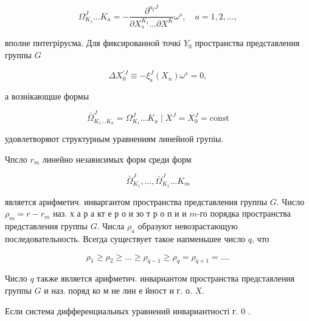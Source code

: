 \documentclass[10pt]{article}
\begin{document}
\[

\Omega_{K_{1}}^{J} \ldots K_{a}=-\frac{\partial^{a_{\xi} J}}{\partial X_{s}^{K_{1}} \ldots \partial X^{K}} \omega^{s}, \quad a=1,2, \ldots,

\]



вполне пнтегрірусма. Для фиксированной точкі $Y_{0}$ пространства представления группы $G$



\[

\Delta X_{0}^{\prime J} \equiv-\xi_{\mathrm{s}}^{J}\left(X_{n}\right) \omega^{s}=0,

\]



а вознікающше формы



\[

\bar{\Omega}_{K_{1} \ldots K_{a}}^{J}=\Omega_{K_{1}}^{J} \ldots K_{a} \mid X^{J}=X_{0}^{J}=\mathrm{const}

\]



удовлетворяют структурным уравнениям линейной групіы.



Чпсло $r_{m}$ линейно независимых форм среди форм



\[

\bar{\Omega}_{K_{1}}^{J}, \ldots, \bar{\Omega}_{K_{1}}^{J} \ldots K_{m}

\]



является арифметич. инваргантом пространства представления группы $G$. Число $\rho_{m}=r-r_{m}$ наз. х а р а кт е р о и зо т р о п и и $m$-го порядка пространства представления группы $G$. Числа $\rho_{a}$ образуют невозрастающую последовательность. Всегда существует такое напменьшее число $q$, что



\[

\rho_{1} \geqslant \rho_{2} \geqslant \ldots \geqslant \rho_{q-1} \geqslant \rho_{q}=\rho_{q+1}=\ldots .

\]



Число $q$ также является арифметич. инвариантом пространства представления группы $G$ и наз. поряд ко м не лин е йност и г. о. $X$.



Если система дифференциальных уравнений инвариантності г. 0 .
\end{document}
